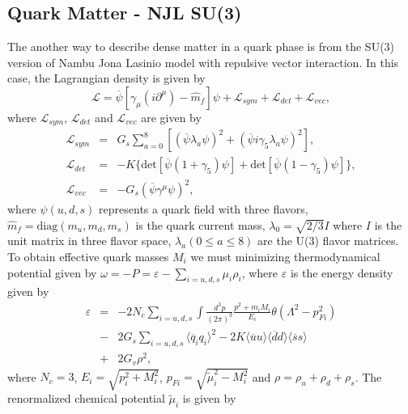 \documentclass[prc, reprint, amsmath, floatfix,10pt]{revtex4-1}
\begin{document}
\subsection{Quark Matter - NJL SU(3)}\label{NJLSU3}

The another way to describe dense matter in a quark phase is from the
SU(3) version of Nambu Jona Lasinio model with repulsive vector interaction. In this case,
the Lagrangian density is given by
\begin{equation}
\mathscr{L}=\overline{\psi}[\gamma_\mu(i\partial^\mu)-\widehat{m}_f]\psi+
\mathscr{L}_{sym}+\mathscr{L}_{det}+\mathscr{L}_{vec},
\end{equation}
where $\mathscr{L}_{sym}$, $\mathscr{L}_{det}$ and $\mathscr{L}_{vec}$ are given by
\begin{eqnarray}
\mathscr{L}_{sym}&=&G_s\sum_{a=0}^8[(\overline{\psi}\lambda_a\psi)^2+(\overline{\psi}i\gamma_5\lambda_a\psi)^2],\nonumber\\
\mathscr{L}_{det}&=&-K\{\mbox{det}[\overline{\psi}(1+\gamma_5)\psi]+\mbox{det}[\overline{\psi}(1-\gamma_5)\psi]\},\nonumber\\
\mathscr{L}_{vec}&=&-G_s(\overline{\psi}\gamma^\mu\psi)^2,\nonumber
\end{eqnarray}
where $\psi(u,d,s)$ represents a quark field with three flavors,
$\widehat{m}_f=\mbox{diag}(m_u,m_d,m_s)$ is the quark current mass,
$\lambda_0=\sqrt{2/3}I$ where $I$ is the unit matrix in three flavor space,
$\lambda_a(0\leq a \leq 8)$ are the U(3) flavor matrices. 
To obtain effective quark masses $M_i$ we must minimizing thermodynamical potential 
given by $\omega=-P=\varepsilon-\sum_{i=u,d,s}\mu_i\rho_i$, where $\varepsilon$ is the energy
density given by
\begin{eqnarray}
\varepsilon&=&-2N_c\sum_{i=u,d,s}\int\frac{d^3p}{(2\pi)^3}\frac{p^2+m_iM_i}{E_i}\theta(\Lambda^2-p_{Fi}^2)\nonumber\\
&-&2G_s\sum_{i=u,d,s}\langle\overline{q}_iq_i\rangle^2-2K\langle\overline{u}u\rangle\langle\overline{d}d\rangle\langle\overline{s}s\rangle\\
&+&2G_v\rho^2,\nonumber
\end{eqnarray}
where $N_c=3$, $E_i=\sqrt{p_i^2+M_i^2}$, $p_{Fi}=\sqrt{\widetilde{\mu}_i^2-M_i^2}$ and $\rho=\rho_u+\rho_d+\rho_s$.
The renormalized chemical potential $\widetilde{\mu}_i$ is given by
\end{document}
